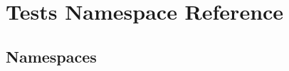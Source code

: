 \hypertarget{namespace_tests}{}\section{Tests Namespace Reference}
\label{namespace_tests}
\subsection*{Namespaces}
\begin{DoxyCompactItemize}
\end{DoxyCompactItemize}
